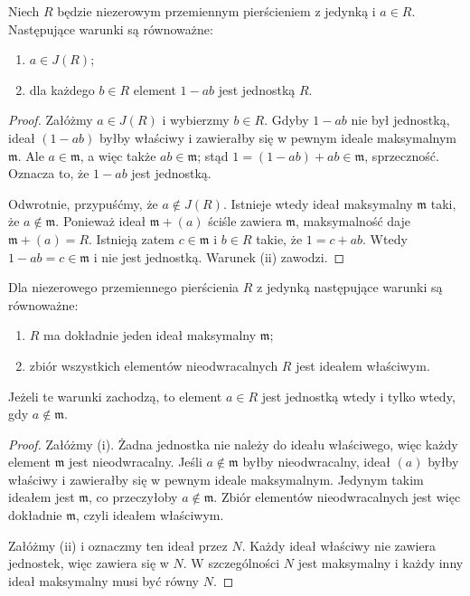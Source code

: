 \begin{twierdzenie}
\label{aa:tw:jacobson-unit-criterion}
Niech $R$ będzie niezerowym przemiennym pierścieniem
z jedynką i $a\in R$. Następujące warunki są równoważne:
\begin{enumerate}[label=\textup{(\roman*)}]
\item $a\in J(R)$;
\item dla każdego $b\in R$ element $1-ab$ jest jednostką $R$.
\end{enumerate}
\end{twierdzenie}
\begin{proof}
Załóżmy $a\in J(R)$ i wybierzmy $b\in R$.
Gdyby $1-ab$ nie był jednostką, ideał $(1-ab)$
byłby właściwy i zawierałby się w pewnym ideale
maksymalnym $\mathfrak m$. Ale $a\in\mathfrak m$,
a więc także $ab\in\mathfrak m$; stąd
$1=(1-ab)+ab\in\mathfrak m$, sprzeczność.
Oznacza to, że $1-ab$ jest jednostką.

Odwrotnie, przypuśćmy, że $a\notin J(R)$.
Istnieje wtedy ideał maksymalny $\mathfrak m$ taki,
że $a\notin\mathfrak m$. Ponieważ ideał
$\mathfrak m+(a)$ ściśle zawiera $\mathfrak m$,
maksymalność daje $\mathfrak m+(a)=R$.
Istnieją zatem $c\in\mathfrak m$ i $b\in R$
takie, że $1=c+ab$. Wtedy $1-ab=c\in\mathfrak m$
i nie jest jednostką. Warunek (ii) zawodzi.
\end{proof}

\begin{twierdzenie}
\label{aa:tw:local-nonunits}
Dla niezerowego przemiennego pierścienia $R$ z jedynką
następujące warunki są równoważne:
\begin{enumerate}[label=\textup{(\roman*)}]
\item $R$ ma dokładnie jeden ideał maksymalny $\mathfrak m$;
\item zbiór wszystkich elementów nieodwracalnych $R$
      jest ideałem właściwym.
\end{enumerate}
Jeżeli te warunki zachodzą, to element $a\in R$ jest
jednostką wtedy i tylko wtedy, gdy $a\notin\mathfrak m$.
\end{twierdzenie}
\begin{proof}
Załóżmy (i). Żadna jednostka nie należy do ideału
właściwego, więc każdy element $\mathfrak m$ jest
nieodwracalny. Jeśli $a\notin\mathfrak m$ byłby
nieodwracalny, ideał $(a)$ byłby właściwy i zawierałby
się w pewnym ideale maksymalnym. Jedynym takim ideałem
jest $\mathfrak m$, co przeczyłoby $a\notin\mathfrak m$.
Zbiór elementów nieodwracalnych jest więc dokładnie
$\mathfrak m$, czyli ideałem właściwym.

Załóżmy (ii) i oznaczmy ten ideał przez $N$.
Każdy ideał właściwy nie zawiera jednostek, więc
zawiera się w $N$. W szczególności $N$ jest maksymalny
i każdy inny ideał maksymalny musi być równy $N$.
\end{proof}

